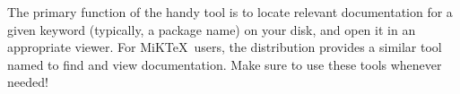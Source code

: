
The primary function of the handy  tool is to locate relevant documentation for a given keyword (typically, a package name) on your disk, and open it in an appropriate viewer. For MiK\TeX\ users, the distribution provides a similar tool named  to find and view documentation. Make sure to use these tools whenever needed!
